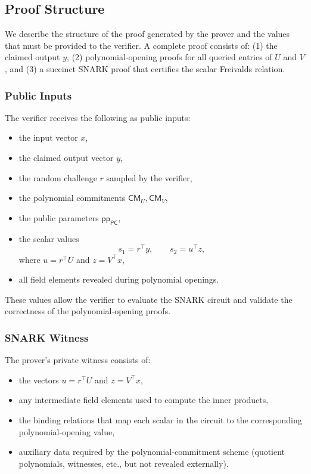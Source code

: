 \documentclass[11pt]{article}
\begin{document}
\subsection{Proof Structure}

We describe the structure of the proof generated by the prover and the
values that must be provided to the verifier.  
A complete proof consists of:
(1) the claimed output $y$,  
(2) polynomial-opening proofs for all queried entries of $U$ and $V$,  
and (3) a succinct SNARK proof that certifies the scalar Freivalds relation.

\subsubsection{Public Inputs}

The verifier receives the following as public inputs:

\begin{itemize}
  \item the input vector $x$,
  \item the claimed output vector $y$,
  \item the random challenge $r$ sampled by the verifier,
  \item the polynomial commitments $\mathsf{CM}_U, \mathsf{CM}_V$,
  \item the public parameters $\mathsf{pp}_{\mathsf{PC}}$,
  \item the scalar values
        \[
          s_1 = r^\top y,\qquad s_2 = u^\top z,
        \]
        where $u = r^\top U$ and $z = V^\top x$,
  \item all field elements revealed during polynomial openings.
\end{itemize}

These values allow the verifier to evaluate the SNARK circuit and
validate the correctness of the polynomial-opening proofs.

\subsubsection{SNARK Witness}

The prover’s private witness consists of:

\begin{itemize}
  \item the vectors $u = r^\top U$ and $z = V^\top x$,
  \item any intermediate field elements used to compute the inner products,
  \item the binding relations that map each scalar in the circuit
        to the corresponding polynomial-opening value,
  \item auxiliary data required by the polynomial-commitment scheme
        (quotient polynomials, witnesses, etc., but not revealed externally).
\end{itemize}
\end{document}
